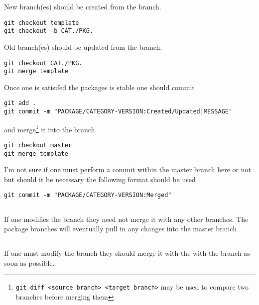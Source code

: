 \documentclass{article}
\begin{document}
\vspace{0.75ex}
\noindent
\begin{minipage}{0.48\textwidth}
New  branch(es) should be created from the  branch.
\begin{lstlisting}[basicstyle=\small]
git checkout template
git checkout -b CAT./PKG.
\end{lstlisting}
\end{minipage}
\hfill\hfill
\begin{minipage}{0.48\textwidth}
Old  branch(es) should be updated from the  branch.
\begin{lstlisting}[basicstyle=\small]
git checkout CAT./PKG.
git merge template
\end{lstlisting}
\end{minipage}
\noindent
Once one is satisifed the packages is stable one should commit
\begin{lstlisting}
git add .
git commit -m "PACKAGE/CATEGORY-VERSION:Created/Updated|MESSAGE"
\end{lstlisting}
and merge\footnote{\lstinline|git diff <source branch> <target branch>| may be used to compare two branches before merging them} it into the  branch.
\begin{lstlisting}
git checkout master
git merge template
\end{lstlisting}

I'm not sure if one must perform a commit within the master branch here or not but should it be necessary the following format should be used
\begin{lstlisting}
git commit -m "PACKAGE/CATEGORY-VERSION:Merged"
\end{lstlisting}

\subsection{}

If one modifies the  branch they need not merge it with any other branches. 
The package branches will eventually pull in any changes into the master branch

\subsection{}

If one must modify the  branch they should merge it with the with the  branch as soon as possible.
\end{document}
